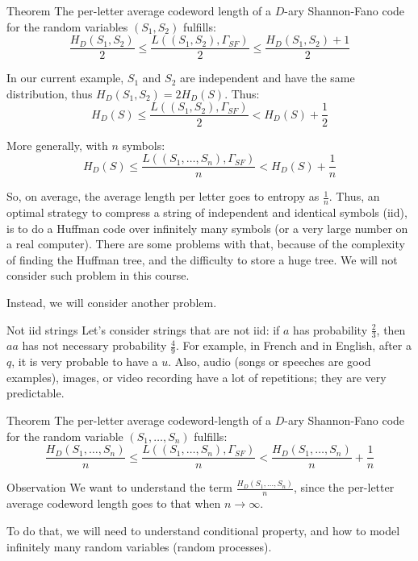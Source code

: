 \documentclass[a4paper]{article}
\begin{document}
\begin{parag}{Theorem}
    The per-letter average codeword length of a $D$-ary Shannon-Fano code for the random variables $\left(S_1, S_2\right)$ fulfills:
    \[\frac{H_D\left(S_1, S_2\right)}{2} \leq \frac{L\left(\left(S_1, S_2\right), \Gamma_{SF}\right)}{2} \leq \frac{H_D\left(S_1, S_2\right) + 1}{2}\]

    In our current example, $S_1$ and $S_2$ are independent and have the same distribution, thus $H_{D}\left(S_1, S_2\right)= 2H_D\left(S\right)$. Thus:
    \[H_D\left(S\right) \leq \frac{L\left(\left(S_1, S_2\right), \Gamma_{SF}\right)}{2} < H_D\left(S\right) + \frac{1}{2}\]

    More generally, with $n$ symbols:
    \[H_D\left(S\right) \leq \frac{L\left(\left(S_1, \ldots, S_n\right), \Gamma_{SF}\right)}{n} < H_D\left(S\right) + \frac{1}{n}\]

    So, on average, the average length per letter goes to entropy as $\frac{1}{n}$. Thus, an optimal strategy to compress a string of independent and identical symbols (iid), is to do a Huffman code over infinitely many symbols (or a very large number on a real computer). There are some problems with that, because of the complexity of finding the Huffman tree, and the difficulty to store a huge tree. We will not consider such problem in this course.

    Instead, we will consider another problem.
\end{parag}

\begin{parag}{Not iid strings}
    Let's consider strings that are not iid: if $a$ has probability $\frac{2}{3}$, then $aa$ has not necessary probability $\frac{4}{9}$. For example, in French and in English, after a $q$, it is very probable to have a $u$. Also, audio (songs or speeches are good examples), images, or video recording have a lot of repetitions; they are very predictable.
\end{parag}

\begin{parag}{Theorem}
    The per-letter average codeword-length of a $D$-ary Shannon-Fano code for the random variable $\left(S_1, \ldots, S_n\right)$ fulfills:
    \[\frac{H_D\left(S_1, \ldots, S_n\right)}{n} \leq \frac{L\left(\left(S_1, \ldots, S_n\right), \Gamma_{SF}\right)}{n} < \frac{H_D\left(S_1, \ldots, S_n\right)}{n} + \frac{1}{n}\]

    \begin{subparag}{Observation}
        We want to understand the term $\frac{H_D\left(S_1, \ldots, S_n\right)}{n}$, since the per-letter average codeword length goes to that when $n \to \infty$.

        To do that, we will need to understand conditional property, and how to model infinitely many random variables (random processes).
    \end{subparag}
\end{parag}
\end{document}
